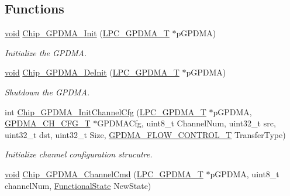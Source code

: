 \subsection*{Functions}
\begin{DoxyCompactItemize}
\item 
\hyperlink{Paradigm_2Tern__EE_2small_2portmacro_8h_a14d32f8130d3c0b212cfc751730b5b49}{void} \hyperlink{group__GPDMA__17XX__40XX_ga21c99277e4579af4be9d9311a03b5542}{Chip\-\_\-\-G\-P\-D\-M\-A\-\_\-\-Init} (\hyperlink{structLPC__GPDMA__T}{L\-P\-C\-\_\-\-G\-P\-D\-M\-A\-\_\-\-T} $\ast$p\-G\-P\-D\-M\-A)
\begin{DoxyCompactList}\small\item\em Initialize the G\-P\-D\-M\-A. \end{DoxyCompactList}\item 
\hyperlink{Paradigm_2Tern__EE_2small_2portmacro_8h_a14d32f8130d3c0b212cfc751730b5b49}{void} \hyperlink{group__GPDMA__17XX__40XX_ga673cc6cab2ad87185f5f5d0ff8424075}{Chip\-\_\-\-G\-P\-D\-M\-A\-\_\-\-De\-Init} (\hyperlink{structLPC__GPDMA__T}{L\-P\-C\-\_\-\-G\-P\-D\-M\-A\-\_\-\-T} $\ast$p\-G\-P\-D\-M\-A)
\begin{DoxyCompactList}\small\item\em Shutdown the G\-P\-D\-M\-A. \end{DoxyCompactList}\item 
int \hyperlink{group__GPDMA__17XX__40XX_gac32ac477dbee2d3be93ca90b30db856c}{Chip\-\_\-\-G\-P\-D\-M\-A\-\_\-\-Init\-Channel\-Cfg} (\hyperlink{structLPC__GPDMA__T}{L\-P\-C\-\_\-\-G\-P\-D\-M\-A\-\_\-\-T} $\ast$p\-G\-P\-D\-M\-A, \hyperlink{structGPDMA__CH__CFG__T}{G\-P\-D\-M\-A\-\_\-\-C\-H\-\_\-\-C\-F\-G\-\_\-\-T} $\ast$G\-P\-D\-M\-A\-Cfg, uint8\-\_\-t Channel\-Num, uint32\-\_\-t src, uint32\-\_\-t dst, uint32\-\_\-t Size, \hyperlink{group__GPDMA__17XX__40XX_ga2cb59b641cd840f22780c44be1208133}{G\-P\-D\-M\-A\-\_\-\-F\-L\-O\-W\-\_\-\-C\-O\-N\-T\-R\-O\-L\-\_\-\-T} Transfer\-Type)
\begin{DoxyCompactList}\small\item\em Initialize channel configuration strucutre. \end{DoxyCompactList}\item 
\hyperlink{Paradigm_2Tern__EE_2small_2portmacro_8h_a14d32f8130d3c0b212cfc751730b5b49}{void} \hyperlink{group__GPDMA__17XX__40XX_gae93a1b9cb8ee1a04176ce51a9a4ad073}{Chip\-\_\-\-G\-P\-D\-M\-A\-\_\-\-Channel\-Cmd} (\hyperlink{structLPC__GPDMA__T}{L\-P\-C\-\_\-\-G\-P\-D\-M\-A\-\_\-\-T} $\ast$p\-G\-P\-D\-M\-A, uint8\-\_\-t channel\-Num, \hyperlink{group__LPC__Types__Public__Types_gac9a7e9a35d2513ec15c3b537aaa4fba1}{Functional\-State} New\-State)

\end{DoxyCompactItemize}
